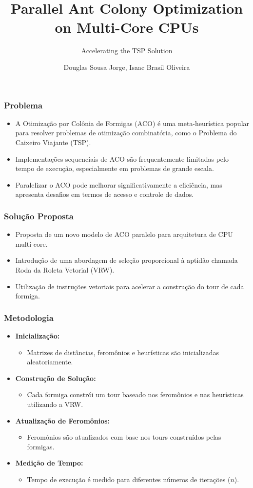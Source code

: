 \documentclass{beamer}
\title{Parallel Ant Colony Optimization on Multi-Core CPUs}
\subtitle{Accelerating the TSP Solution}
\author{Douglas Sousa Jorge, Isaac Brasil Oliveira}
\institute{INF - UFG}
\date{}
\begin{document}
	
	\frame{\titlepage}
	
	\begin{frame}
		\frametitle{Problema}
		\begin{itemize}
			\item A Otimização por Colônia de Formigas (ACO) é uma meta-heurística popular para resolver problemas de otimização combinatória, como o Problema do Caixeiro Viajante (TSP).
			\item Implementações sequenciais de ACO são frequentemente limitadas pelo tempo de execução, especialmente em problemas de grande escala.
			\item Paralelizar o ACO pode melhorar significativamente a eficiência, mas apresenta desafios em termos de acesso e controle de dados.
		\end{itemize}
	\end{frame}
	
	\begin{frame}
		\frametitle{Solução Proposta}
		\begin{itemize}
			\item Proposta de um novo modelo de ACO paralelo para arquitetura de CPU multi-core.
			\item Introdução de uma abordagem de seleção proporcional à aptidão chamada Roda da Roleta Vetorial (VRW).
			\item Utilização de instruções vetoriais para acelerar a construção do tour de cada formiga.
		\end{itemize}
	\end{frame}
	
	\begin{frame}
		\frametitle{Metodologia}
		\begin{itemize}
			\item \textbf{Inicialização:}
			\begin{itemize}
				\item Matrizes de distâncias, feromônios e heurísticas são inicializadas aleatoriamente.
			\end{itemize}
			\item \textbf{Construção de Solução:}
			\begin{itemize}
				\item Cada formiga constrói um tour baseado nos feromônios e nas heurísticas utilizando a VRW.
			\end{itemize}
			\item \textbf{Atualização de Feromônios:}
			\begin{itemize}
				\item Feromônios são atualizados com base nos tours construídos pelas formigas.
			\end{itemize}
			\item \textbf{Medição de Tempo:}
			\begin{itemize}
				\item Tempo de execução é medido para diferentes números de iterações (\(n\)).
			\end{itemize}
		\end{itemize}
	\end{frame}
	
\end{document}

